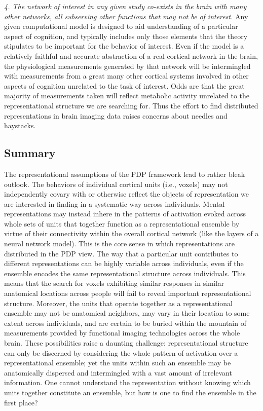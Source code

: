 {\em 4. The network of interest in any given study co-exists in the brain with many other networks, all subserving other functions that may not be of interest.} Any given computational model is designed to aid understanding of a particular aspect of cognition, and typically includes only those elements that the theory stipulates to be important for the behavior of interest. Even if the model is a relatively faithful and accurate abstraction of a real cortical network in the brain, the physiological measurements generated by that network will be intermingled with measurements from a great many other cortical systems involved in other aspects of cognition unrelated to the task of interest. Odds are that the great majority of measurements taken will reflect metabolic activity unrelated to the representational structure we are searching for. Thus the effort to find distributed representations in brain imaging data raises concerns about needles and haystacks. 


\subsection{Summary}
The representational assumptions of the PDP framework lead to rather bleak outlook. The behaviors of individual cortical units (i.e., voxels) may not independently covary with or otherwise reflect the objects of representation we are interested in finding in a systematic way across individuals. Mental representations may instead inhere in the patterns of activation evoked across whole sets of units that together function as a representational ensemble by virtue of their connectivity within the overall cortical network (like the layers of a neural network model). This is the core sense in which representations are distributed in the PDP view. The way that a particular unit contributes to different representations can be highly variable across individuals, even if the ensemble encodes the same representational structure across individuals. This means that the search for voxels exhibiting similar responses in similar anatomical locations across people will fail to reveal important representational structure. Moreover, the units that operate together as a representational ensemble may not be anatomical neighbors, may vary in their location to some extent across individuals, and are certain to be buried within the mountain of measurements provided by functional imaging technologies across the whole brain. These possibilities raise a daunting challenge: representational structure can only be discerned by considering the whole pattern of activation over a representational ensemble; yet the units within such an ensemble may be anatomically dispersed and intermingled with a vast amount of irrelevant information. One cannot understand the representation without knowing which units together constitute an ensemble, but how is one to find the ensemble in the first place?

